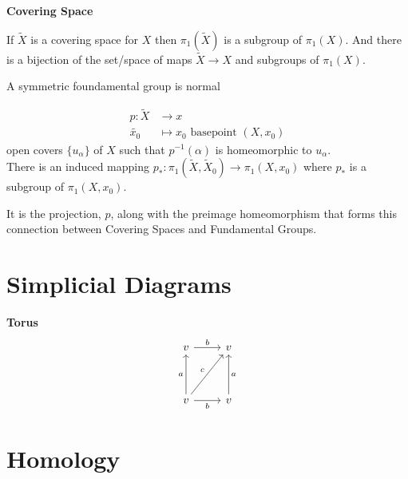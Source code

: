 \documentclass[12pt,a4paper]{report}
\begin{document}
\begin{description}
\begin{theorem}
	\end{theorem}
	
	\item \textbf{Covering Space}
	
	If $\tilde{X}$ is a covering space for $X$ then $\pi_1(\tilde{X})$ is a subgroup of $\pi_1(X)$.  And there is a bijection of the set/space of maps $\tilde{X} \to X$ and subgroups of $\pi_1(X)$.
	
	A symmetric foundamental group is normal
	
	\begin{definition}
	\begin{align*}
		p: \tilde{X} &\to x\\
		\tilde{x_0} & \mapsto x_0 \text{  basepoint } (X, x_0)
	\end{align*}open covers $\{u_\alpha\}$ of $X$ such that $p^{-1}(\alpha)$ is homeomorphic to $u_\alpha$.\\
	
	There is an induced mapping $p_*: \pi_1(\tilde{X},\tilde{X}_0) \to \pi_1(X, x_0)$ where $p_*$ is a subgroup of $\pi_1(X, x_0)$.
	\end{definition}
\end{description}

\begin{remark}It is the projection, $p$, along with the preimage homeomorphism that forms this connection between Covering Spaces and Fundamental Groups.
\end{remark}

\section*{Simplicial Diagrams}

\begin{description}
	\item \textbf{Torus}
\[\begin{tikzcd}[row sep=huge]
		v \arrow[r, "b"] & v \\
		v \arrow[u, "a" ] \arrow[r, swap, "b"]  \arrow[ru, "c"] & 
		v \arrow[u, swap, "a"]
	\end{tikzcd}\]
\end{description}

\section*{Homology}
\end{document}
